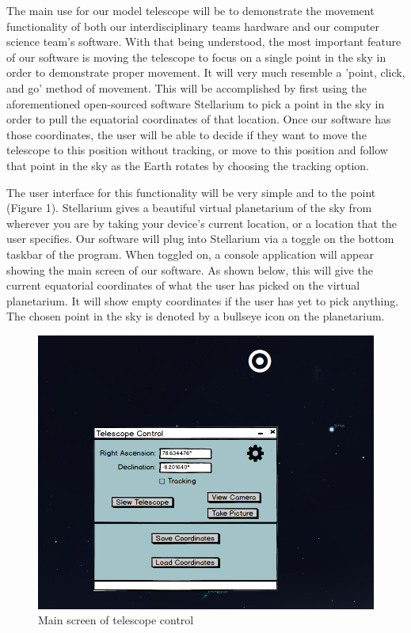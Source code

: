 \documentclass[12pt]{report}
\begin{document}
The main use for our model telescope will be to demonstrate the movement functionality of both our interdisciplinary teams hardware and our computer science team's software. With that being understood, the most important feature of our software is moving the telescope to focus on a single point in the sky in order to demonstrate proper movement. It will very much resemble a 'point, click, and go' method of movement. This will be accomplished by first using the aforementioned open-sourced software Stellarium to pick a point in the sky in order to pull the equatorial coordinates of that location. Once our software has those coordinates, the user will be able to decide if they want to move the telescope to this position without tracking, or move to this position and follow that point in the sky as the Earth rotates by choosing the tracking option.

The user interface for this functionality will be very simple and to the point (Figure 1). Stellarium gives a beautiful virtual planetarium of the sky from wherever you are by taking your device's current location, or a location that the user specifies. Our software will plug into Stellarium via a toggle on the bottom taskbar of the program. When toggled on, a console application will appear showing the main screen of our software. As shown below, this will give the current equatorial coordinates of what the user has picked on the virtual planetarium. It will show empty coordinates if the user has yet to pick anything. The chosen point in the sky is denoted by a bullseye icon on the planetarium.

\begin{figure}[h]
	\centering
	\includegraphics[width=0.85\linewidth]{MainScreen}
	\caption{Main screen of telescope control}
\end{figure}
\end{document}
